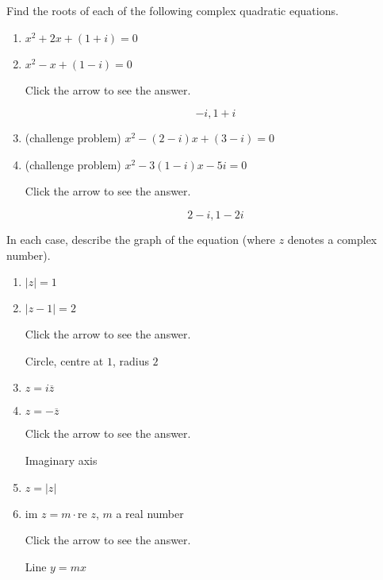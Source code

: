 \documentclass{ximera}
\begin{document}
\begin{problem}\label{prb:A.11}
Find the roots of each of the following complex quadratic equations.

\begin{enumerate}
\item $x^{2} + 2x + (1 + i) = 0$
\item  $x^{2} - x + (1 - i) = 0$

Click the arrow to see the answer.
\begin{expandable}
$$-i, 1 + i$$
\end{expandable}

\item (challenge problem) $x^{2} - (2 - i)x + (3 - i) = 0$
\item (challenge problem) $x^{2} - 3(1 - i)x - 5i = 0$

Click the arrow to see the answer.
\begin{expandable}
$$2 - i, 1 - 2i$$
\end{expandable}
\end{enumerate}
\end{problem}

\begin{problem}\label{prb:A.12}
In each case, describe the graph of the equation (where $z$ denotes a complex number).

\begin{enumerate}
\item $|z| = 1$
\item $|z - 1| = 2$

Click the arrow to see the answer.
\begin{expandable}
Circle, centre at $1$, radius $2$
\end{expandable}

\item $z = i \overline{z}$
\item $z = -\overline{z}$

Click the arrow to see the answer.
\begin{expandable}
Imaginary axis
\end{expandable}

\item $z = |z|$
\item $\mbox{im }z = m \cdot \mbox{re }z$, $m$ a real number

Click the arrow to see the answer.
\begin{expandable}
 Line $y = mx$
\end{expandable}

\end{enumerate}
\end{problem}
\end{document}
